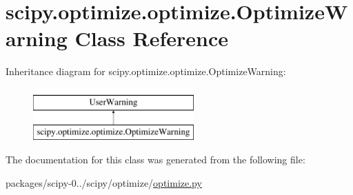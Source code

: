 \hypertarget{classscipy_1_1optimize_1_1optimize_1_1OptimizeWarning}{}\section{scipy.\+optimize.\+optimize.\+Optimize\+Warning Class Reference}
\label{classscipy_1_1optimize_1_1optimize_1_1OptimizeWarning}
Inheritance diagram for scipy.\+optimize.\+optimize.\+Optimize\+Warning\+:\begin{figure}[H]
\begin{center}
\leavevmode
\includegraphics[height=2.000000cm]{classscipy_1_1optimize_1_1optimize_1_1OptimizeWarning}
\end{center}
\end{figure}


The documentation for this class was generated from the following file\+:\begin{DoxyCompactItemize}
\item 
packages/scipy-\/0../scipy/optimize/\hyperlink{optimize_8py}{optimize.\+py}\end{DoxyCompactItemize}
